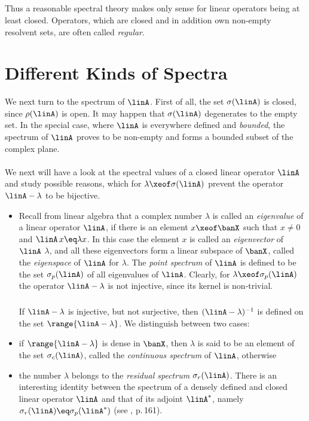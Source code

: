 \documentclass[11pt,twoside]{article}
\begin{document}
\subparagraph{}
Thus a reasonable spectral theory makes only sense
for linear operators being at least closed.
Operators,
which are closed and in addition own non-empty resolvent sets,
are often called \textit{regular}.

\section{Different Kinds of Spectra}
We next turn to the spectrum of $\linA$.
First of all,
the set $\sigma(\linA)$ is closed,
since $\rho(\linA)$ is open.
It may happen that $\sigma(\linA)$ degenerates to the empty set.
In the special case,
where $\linA$ is everywhere defined and \textit{bounded},
the spectrum of $\linA$ proves to be non-empty and forms a bounded subset
of the complex plane.

\paragraph{} %
We next will have a look at the spectral values
of a closed linear operator $\linA$ and study possible reasons,
which for $\lambda \xeof \sigma(\linA)$
prevent the operator $\linA - \lambda$ to be bijective.

\begin{itemize}[leftmargin=12pt]
\item[1.]
Recall from linear algebra
that a complex number $\lambda$ is called an \textit{eigenvalue}
of a linear operator $\linA$,
if there is an element $x \xeof \banX$ such that
$x \neq 0$ and $\linA \,x \eq \lambda x$.
In this case the element $x$ is called an \textit{eigenvector} of $\linA$
{\wrt} $\lambda$,
and all these eigenvectors form a linear subspace of $\banX$,
called the \textit{eigenspace} of $\linA$ for $\lambda$.
The \textit{point spectrum} of $\linA$ is defined to be
the set $\sigma_p(\linA)$ of all eigenvalues of $\linA$.
Clearly,
for $\lambda \xeof \sigma_p(\linA)$ the operator
$\linA - \lambda$ is not injective,
since its kernel is non-trivial.

\subparagraph{}
If $\linA - \lambda$ is injective,
but not surjective,
then $(\linA-\lambda)^{-1}$ is defined on the set $\range{\linA - \lambda}$.
We distinguish between two cases:

\item[2.]
if $\range{\linA - \lambda}$ is dense in $\banX$,
then $\lambda$ is said to be an element of the set $\sigma_c(\linA)$,
called the \textit{continuous spectrum} of $\linA$,
otherwise

\item[3.]
the number $\lambda$ belongs to the \textit{residual spectrum}
$\sigma_r(\linA)$.
There is an interesting identity between the spectrum
of a densely defined and closed linear operator $\linA$
and that of its adjoint $\linA^*$, namely
$\sigma_r(\linA) \eq \sigma_p(\linA^*)$ (see \cite{VI_EN}, p.\,161).
\end{itemize}
\end{document}
